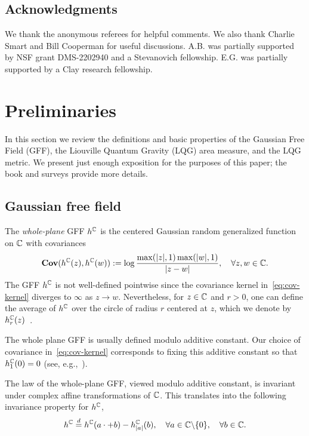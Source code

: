 \documentclass[12pt]{amsart}
\numberwithin{equation}{section}
\begin{document}
	\subsection*{Acknowledgments}
	We thank the anonymous referees for helpful comments. We also thank Charlie Smart and Bill Cooperman for useful discussions. 
	A.B. was partially supported by NSF grant DMS-2202940 and a Stevanovich fellowship. 
	E.G. was partially supported by a Clay research fellowship.
	
	\section{Preliminaries}\label{sec:gff-and-lqg}
	
	
	In this section we review the definitions and basic properties of the Gaussian Free Field (GFF),
	the Liouville Quantum Gravity (LQG) area measure, and the LQG metric.  We present just enough exposition for the purposes of this paper; 
	the book \cite{berestycki2021gaussian} and surveys \cite{gwynne2020random,ding2021introduction,sheffield-icm} provide more details.
	
	\subsection{Gaussian free field}
	The {\it whole-plane} GFF $h^{\mathbb{C}}$ is the centered Gaussian random generalized 
	function on $\mathbb{C}$ with covariances
	\begin{equation} \label{eq:cov-kernel}
	\mathop{\bf Cov{}}(h^{\mathbb{C}}(z), h^{\mathbb{C}}(w)) := \log \frac{\max(|z|,1) \max(|w|,1)}{|z-w|} ,\quad\forall z,w\in\mathbb{C} .
	\end{equation} 
	The GFF $h^{\mathbb{C}}$ is not well-defined pointwise since the covariance kernel in~\eqref{eq:cov-kernel} diverges to $\infty$ as $z\to w$. 
	Nevertheless, for $z\in\mathbb{C}$ and $r>0$, one can define the average of $h^{\mathbb{C}}$ over the circle of radius $r$ centered at $z$, which we denote by $h^{\mathbb{C}}_r(z)$~\cite[Section 3.1]{duplantier2011liouville}. 
	
	The whole plane GFF is usually defined modulo additive constant. Our choice of covariance in~\eqref{eq:cov-kernel} corresponds to fixing this additive constant so that $h^{\mathbb{C}}_1(0) = 0$ (see, e.g.,~\cite[Section 2.1.1]{vargas2017lecture}).
	
	The law of the whole-plane GFF, viewed modulo additive constant, is invariant under complex affine transformations of $\mathbb{C}$. This translates into the following
	invariance property for $h^{\mathbb{C}}$,
	\begin{equation} \label{eq:gff-scaling}
	h^{\mathbb{C}} \overset{d}{=} h^{\mathbb{C}}(a\cdot +b) - h^{\mathbb{C}}_{|a|}(b), \quad \forall a \in \mathbb{C} \backslash \{0\}, \quad \forall b \in \mathbb{C}. 
	\end{equation}
	
\end{document}

